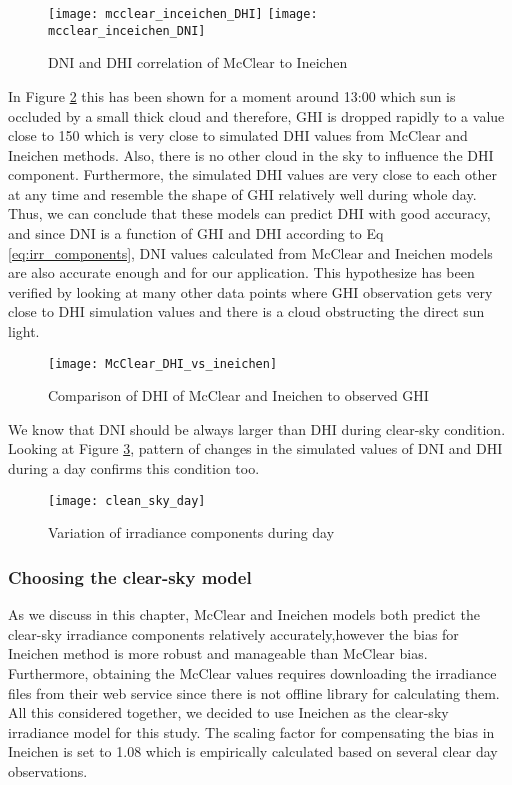 \begin{figure}[h]
\caption{DNI and DHI correlation of McClear to Ineichen}
\label{fig:mcclear_vs_Ineichen_DNI_DHI}
\texttt{[image: mcclear\_inceichen\_DHI]}
\texttt{[image: mcclear\_inceichen\_DNI]}
\centering
\end{figure}

In Figure \ref{fig:McClear_DHI_vs_ineichen} this has been shown for a moment around 13:00 which sun is occluded by a small thick cloud and therefore, GHI is dropped rapidly to a value close to 150 which is very close to simulated DHI values from McClear and Ineichen methods. Also, there is no other cloud in the sky to influence the DHI component. Furthermore, the simulated DHI values are very close to each other at any time and resemble the shape of GHI relatively well during whole day. Thus, we can conclude that these models can predict DHI with good accuracy, and since DNI is a function of GHI and DHI according to Eq \ref{eq:irr_components}, DNI values calculated from McClear and Ineichen models are also accurate enough and for our application. This hypothesize has been verified by looking at many other data points where GHI observation gets very close to DHI simulation values and there is a cloud obstructing the direct sun light.

\begin{figure}[h]
\caption{Comparison of DHI of McClear and Ineichen to observed GHI}
\label{fig:McClear_DHI_vs_ineichen}
\texttt{[image: McClear\_DHI\_vs\_ineichen]}
\centering
\end{figure}

We know that DNI should be always larger than DHI during clear-sky condition. Looking at Figure \ref{fig:clean_sky_day_irr}, pattern of changes in the simulated values of DNI and DHI during a day confirms this condition too.

\begin{figure}[h]
\caption{Variation of irradiance components during day}
\label{fig:clean_sky_day_irr}
\texttt{[image: clean\_sky\_day]}
\centering
\end{figure}

\subsubsection{Choosing the clear-sky model}
As we discuss in this chapter, McClear and Ineichen models both predict the clear-sky irradiance components relatively accurately,however the bias for Ineichen method is more robust and manageable than McClear bias. Furthermore, obtaining the McClear values requires downloading the irradiance files from their web service since there is not offline library for calculating them. All this considered together, we decided to use Ineichen as the clear-sky irradiance model for this study. The scaling factor for compensating the bias in Ineichen is set to 1.08 which is empirically calculated based on several clear day observations.

